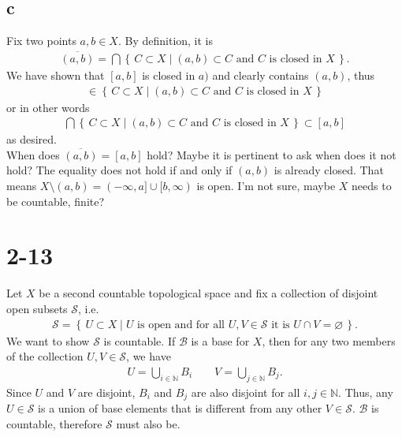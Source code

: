 \documentclass[a4paper]{book}
\theoremstyle{definition}
\newcommand{\makeset}[2]{\left\{\, #1 \mid #2 \,\right\}}
\begin{document}
\subsection*{c}

Fix two points \(a, b \in X\). By definition, it is
\begin{align*}
    \overline{(a, b)} = \bigcap \makeset{C \subset X}{(a, b) \subset C \text{ and } C \text{ is closed in } X} \text{.}
\end{align*}
We have shown that \([a, b]\) is closed in \(a)\) and clearly contains \((a, b)\), thus
\begin{align*}
    [a, b] \in \makeset{C \subset X}{(a, b) \subset C \text{ and } C \text{ is closed in } X}
\end{align*}
or in other words
\begin{align*}
    \bigcap \makeset{C \subset X}{(a, b) \subset C \text{ and } C \text{ is closed in } X} \subset [a, b]
\end{align*}
as desired. \\

\noindent When does \(\overline{(a, b)} = [a, b]\) hold? Maybe it is pertinent to ask when does it not hold? The equality does not hold if and only if \((a, b)\) is already closed. That means \(X \setminus (a, b) = (-\infty, a] \cup [b, \infty) \) is open. I'm not sure, maybe \(X\) needs to be countable, finite?

\section*{2-13}

Let \(X\) be a second countable topological space and fix a collection of disjoint open subsets \(\mathcal{S}\), i.e.
\begin{align*}
    \mathcal{S} = \makeset{U \subset X}{U \text{ is open and for all } U, V \in \mathcal{S} \text{ it is } U \cap V = \varnothing } \text{.}
\end{align*}
We want to show \(\mathcal{S}\) is countable. If \(\mathcal{B}\) is a base for \(X\), then for any two members of the collection \(U, V \in \mathcal{S}\), we have
\begin{align*}
    U = \bigcup_{i \in \mathbb{N}} B_i \qquad V = \bigcup_{j \in \mathbb{N}} B_j \text{.}
\end{align*}
Since \(U\) and \(V\) are disjoint, \(B_i\) and \(B_j\) are also disjoint for all \(i, j \in \mathbb{N}\). Thus, any \(U \in \mathcal{S}\) is a union of base elements that is different from any other \(V \in \mathcal{S}\). \(\mathcal{B}\) is countable, therefore \(\mathcal{S}\) must also be.
\end{document}
